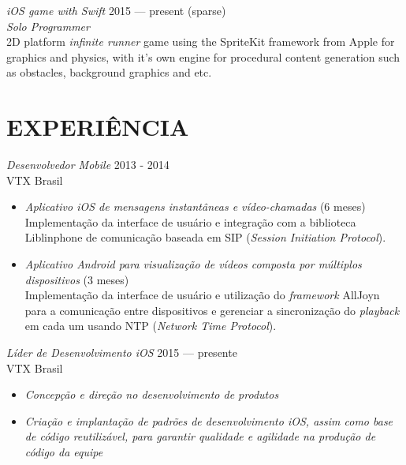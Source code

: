 \documentclass[]{res} %
\newcommand{\sbt}{\,\begin{picture}(-1,1)(-2,-3)\circle*{2}\end{picture}\ }
\def \divspace{6pt}
\def \myitemback{0.55cm}
\def \myitemsep{0pt}
\def \mypositionface{\sl}
\def \myprojectface{\it}
\def \myorgface{\sc}
\newif\ifport
\newif\ifgames
\begin{document}
\begin{resume}
    {\myprojectface iOS game with Swift} \hfill 2015 — present (sparse) \\
    {\mypositionface Solo Programmer} \\
    2D platform {\it infinite runner} game using the SpriteKit framework from Apple for graphics and physics, with it's own engine for procedural content generation such as obstacles, background graphics and etc. \ifgames \href{http://mikail.io/ball/}{[link]} \fi
\fi
\ifport
    \section{EXPERIÊNCIA \hspace{\divspace} }

    {\mypositionface Desenvolvedor Mobile} \hfill 2013 - 2014 \\
    {\myorgface VTX Brasil}

    \begin{itemize}[itemsep=\myitemsep,leftmargin=\myitemback]
    \item[\sbt] {\it Aplicativo iOS de mensagens instantâneas e vídeo-chamadas} \hfill (6 meses)\\
    Implementação da interface de usuário e integração com a biblioteca Liblinphone de comunicação baseada em SIP ({\it Session Initiation Protocol}).
    \item[\sbt] {\it Aplicativo Android para visualização de vídeos composta por múltiplos dispositivos} \hfill (3 meses)\\
    Implementação da interface de usuário e utilização do {\it framework} AllJoyn para a comunicação entre dispositivos e gerenciar a sincronização do {\it playback} em cada um usando NTP ({\it Network Time Protocol}).
    \end{itemize}

    {\mypositionface Líder de Desenvolvimento iOS} \hfill 2015 — presente\\
    {\myorgface VTX Brasil}

    \begin{itemize}[itemsep=\myitemsep,leftmargin=\myitemback]
    \item[\sbt] {\it Concepção e direção no desenvolvimento de produtos}
    \item[\sbt] {\it Criação e implantação de padrões de desenvolvimento iOS, assim como base de código reutilizável, para garantir qualidade e agilidade na produção de código da equipe}


\end{itemize}
\end{resume}
\end{document}
